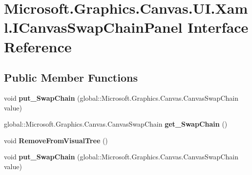 \hypertarget{interface_microsoft_1_1_graphics_1_1_canvas_1_1_u_i_1_1_xaml_1_1_i_canvas_swap_chain_panel}{}\section{Microsoft.\+Graphics.\+Canvas.\+U\+I.\+Xaml.\+I\+Canvas\+Swap\+Chain\+Panel Interface Reference}
\label{interface_microsoft_1_1_graphics_1_1_canvas_1_1_u_i_1_1_xaml_1_1_i_canvas_swap_chain_panel}
\subsection*{Public Member Functions}
\begin{DoxyCompactItemize}
\item 
\mbox{\label{interface_microsoft_1_1_graphics_1_1_canvas_1_1_u_i_1_1_xaml_1_1_i_canvas_swap_chain_panel_a230dd3296100d776c02edcf9059cd075}} 
void {\bfseries put\+\_\+\+Swap\+Chain} (global\+::\+Microsoft.\+Graphics.\+Canvas.\+Canvas\+Swap\+Chain value)
\item 
\mbox{\label{interface_microsoft_1_1_graphics_1_1_canvas_1_1_u_i_1_1_xaml_1_1_i_canvas_swap_chain_panel_a25cb48bff645b2feae644bd69911025b}} 
global\+::\+Microsoft.\+Graphics.\+Canvas.\+Canvas\+Swap\+Chain {\bfseries get\+\_\+\+Swap\+Chain} ()
\item 
\mbox{\label{interface_microsoft_1_1_graphics_1_1_canvas_1_1_u_i_1_1_xaml_1_1_i_canvas_swap_chain_panel_ae575c5d7a21b21b168257ba3b5b70808}} 
void {\bfseries Remove\+From\+Visual\+Tree} ()
\item 
\mbox{\label{interface_microsoft_1_1_graphics_1_1_canvas_1_1_u_i_1_1_xaml_1_1_i_canvas_swap_chain_panel_a230dd3296100d776c02edcf9059cd075}} 
void {\bfseries put\+\_\+\+Swap\+Chain} (global\+::\+Microsoft.\+Graphics.\+Canvas.\+Canvas\+Swap\+Chain value)
\item 

\end{DoxyCompactItemize}
